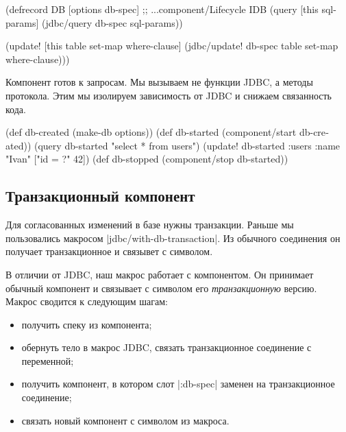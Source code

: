 \begin{english}
  \begin{clojure}
(defrecord DB [options db-spec]
  ;; ...component/Lifecycle
  IDB
  (query [this sql-params]
    (jdbc/query db-spec sql-params))

  (update! [this table set-map where-clause]
    (jdbc/update! db-spec table set-map where-clause)))
  \end{clojure}
\end{english}

Компонент готов к запросам. Мы вызываем не функции JDBC, а методы
протокола. Этим мы изолируем зависимость от JDBC и снижаем связанность кода.

\begin{english}
  \begin{clojure}
(def db-created (make-db options))
(def db-started (component/start db-created))
(query db-started "select * from users")
(update! db-started :users {:name "Ivan"} ["id = ?" 42])
(def db-stopped (component/stop db-started))
  \end{clojure}
\end{english}

\subsection{Транзакционный компонент}

Для согласованных изменений в базе нужны транзакции. Раньше мы пользовались
макросом \spverb|jdbc/with-db-transaction|. Из обычного соединения он получает
транзакционное и связывет с символом.

В отличии от JDBC, наш макрос работает с компонентом. Он принимает обычный
компонент и связывает с символом его \emph{транзакционную} версию. Макрос
сводится к следующим шагам:

\begin{itemize}

\item
  получить спеку из компонента;

\item
  обернуть тело в макрос JDBC, связать транзакционное соединение с переменной;

\item
  получить компонент, в котором слот \spverb|:db-spec| заменен на транзакционное
  соединение;

\item
  связать новый компонент с символом из макроса.

\end{itemize}

